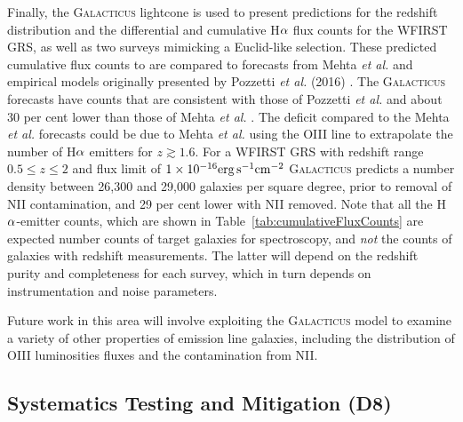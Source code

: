 Finally, the \textsc{Galacticus} lightcone is used to present
predictions for the redshift distribution and the differential and
cumulative H${\rm \alpha}$ flux counts for the WFIRST GRS, as well as
two surveys mimicking a Euclid-like selection. These predicted
cumulative flux counts to are compared to forecasts from Mehta
\textit{et al.} \cite{Mehta2015} and empirical models originally
presented by Pozzetti \textit{et al.} (2016) \cite{Pozzetti15}. The
\textsc{Galacticus} forecasts have counts that are consistent with
those of Pozzetti \textit{et al.} \cite{Pozzetti15} and about 30 per
cent lower than those of Mehta \textit{et al.} \cite{Mehta2015}. The
deficit compared to the Mehta \textit{et al.} forecasts could be due
to Mehta \textit{et al.} using the OIII line to extrapolate the number of
H${\rm \alpha}$ emitters for $z\gtrsim1.6$. 
For a WFIRST GRS with redshift range $0.5\leqslant z\leqslant 2$ and
flux limit of $1\times 10^{-16}{\rm erg}\,{\rm s}^{-1}{\rm cm}^{-2}$
\textsc{Galacticus} predicts a number density between 26,300 and
29,000 galaxies per square degree, prior to removal of NII
contamination, and 29 per cent lower with NII removed. Note that all
the H${\rm \alpha}$-emitter counts, which are shown in
Table~\ref{tab:cumulativeFluxCounts} are expected number counts of
target galaxies for spectroscopy, and \emph{not} the counts of
galaxies with redshift measurements. The latter will depend on the
redshift purity and completeness for each survey, which in turn
depends on instrumentation and noise parameters.

Future work in this area will involve exploiting the
\textsc{Galacticus} model to examine a variety of other properties of
emission line galaxies, including the distribution of OIII
luminosities fluxes and the contamination from NII.





\subsection{Systematics Testing and Mitigation (D8)}
\label{sec:gal_syst}



